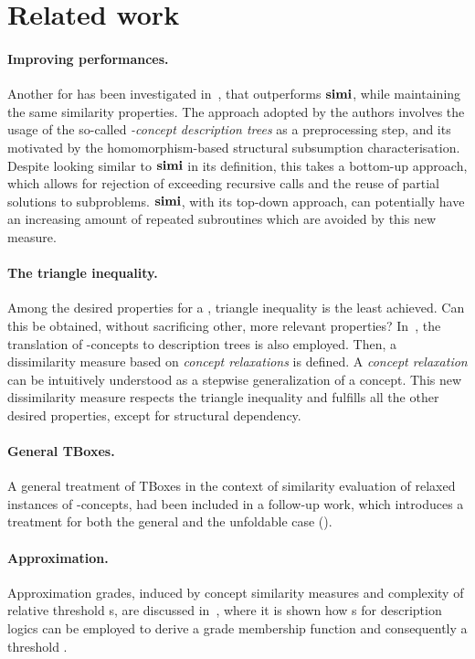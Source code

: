 \section{Related work}

\paragraph{Improving performances.}
Another \csm for \elh has been investigated in~\cite{simEL}, that outperforms \(\operatorname{\mathbf{simi}}\), while maintaining the same similarity properties.
The approach adopted by the authors involves the usage of the so-called \emph{\elh-concept description trees} as a preprocessing step, and its motivated by the homomorphism-based structural subsumption characterisation.
Despite looking similar to \(\operatorname{\mathbf{simi}}\) in its definition, this \csm takes a bottom-up approach, which allows for rejection of exceeding recursive calls and the reuse of partial solutions to subproblems.
\(\operatorname{\mathbf{simi}}\), with its top-down approach, can potentially have an increasing amount of repeated subroutines which are avoided by this new measure.

\paragraph{The triangle inequality.}
Among the desired properties for a \csm, triangle inequality is the least achieved.
Can this be obtained, without sacrificing other, more relevant properties?
In~\cite{TriEq}, the translation of \el-concepts to description trees is also employed. Then, a dissimilarity measure based on \emph{concept relaxations} is defined. A \emph{concept relaxation} can be intuitively understood as a stepwise generalization of a concept.
This new dissimilarity measure respects the triangle inequality and fulfills all the other desired properties, except for structural dependency.

  \paragraph{General TBoxes.} A general treatment of TBoxes in the context of similarity evaluation of relaxed instances of \el-concepts, had been included in a follow-up work, which introduces a treatment for both the general and the unfoldable case (\cite{Ec14}).

  \paragraph{Approximation.} Approximation grades, induced by concept similarity measures and complexity of relative threshold \dl{}s, are discussed in~\cite{Ba17}, where it is shown how \csm{}s for \el description logics can be employed to derive a grade membership function and consequently a threshold \dl.


